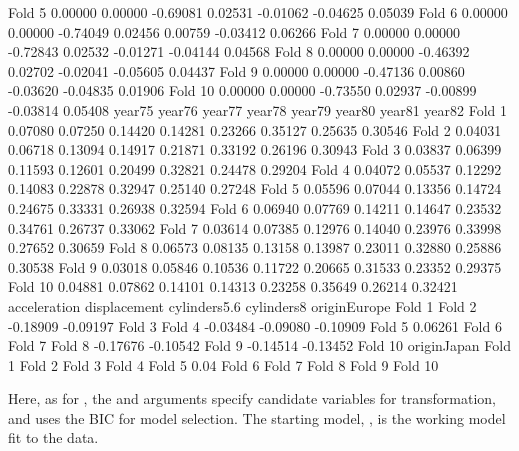 \documentclass[
]{jss}
\begin{document}
\begin{CodeChunk}
\begin{CodeOutput}
Fold 5     0.00000  0.00000 -0.69081  0.02531 -0.01062 -0.04625  0.05039
Fold 6     0.00000  0.00000 -0.74049  0.02456  0.00759 -0.03412  0.06266
Fold 7     0.00000  0.00000 -0.72843  0.02532 -0.01271 -0.04144  0.04568
Fold 8     0.00000  0.00000 -0.46392  0.02702 -0.02041 -0.05605  0.04437
Fold 9     0.00000  0.00000 -0.47136  0.00860 -0.03620 -0.04835  0.01906
Fold 10    0.00000  0.00000 -0.73550  0.02937 -0.00899 -0.03814  0.05408
          year75   year76   year77   year78   year79   year80   year81   year82
Fold 1   0.07080  0.07250  0.14420  0.14281  0.23266  0.35127  0.25635  0.30546
Fold 2   0.04031  0.06718  0.13094  0.14917  0.21871  0.33192  0.26196  0.30943
Fold 3   0.03837  0.06399  0.11593  0.12601  0.20499  0.32821  0.24478  0.29204
Fold 4   0.04072  0.05537  0.12292  0.14083  0.22878  0.32947  0.25140  0.27248
Fold 5   0.05596  0.07044  0.13356  0.14724  0.24675  0.33331  0.26938  0.32594
Fold 6   0.06940  0.07769  0.14211  0.14647  0.23532  0.34761  0.26737  0.33062
Fold 7   0.03614  0.07385  0.12976  0.14040  0.23976  0.33998  0.27652  0.30659
Fold 8   0.06573  0.08135  0.13158  0.13987  0.23011  0.32880  0.25886  0.30538
Fold 9   0.03018  0.05846  0.10536  0.11722  0.20665  0.31533  0.23352  0.29375
Fold 10  0.04881  0.07862  0.14101  0.14313  0.23258  0.35649  0.26214  0.32421
        acceleration displacement cylinders5.6 cylinders8 originEurope
Fold 1                                                                
Fold 2      -0.18909     -0.09197                                     
Fold 3                                                                
Fold 4      -0.03484                  -0.09080   -0.10909             
Fold 5                                                         0.06261
Fold 6                                                                
Fold 7                                                                
Fold 8      -0.17676     -0.10542                                     
Fold 9      -0.14514     -0.13452                                     
Fold 10                                                               
        originJapan
Fold 1             
Fold 2             
Fold 3             
Fold 4             
Fold 5         0.04
Fold 6             
Fold 7             
Fold 8             
Fold 9             
Fold 10            
\end{CodeOutput}
\end{CodeChunk}

Here, as for , the  and
 arguments specify candidate variables for
transformation, and  uses the BIC for model selection.
The starting model, , is the working model fit to the
 data.
\end{document}
